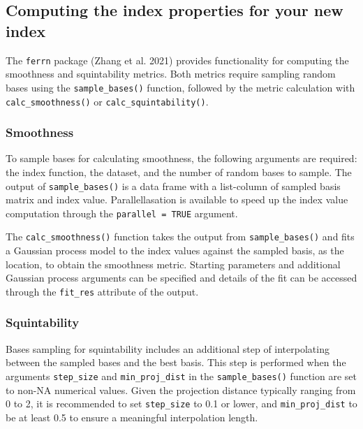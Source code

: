 \documentclass[
  12pt,
]{interact}
\theoremstyle{plain}
\begin{document}
\subsection{Computing the index properties for your new
index}\label{computing-the-index-properties-for-your-new-index}

The \texttt{ferrn} package (Zhang et al. 2021) provides functionality
for computing the smoothness and squintability metrics. Both metrics
require sampling random bases using the \texttt{sample\_bases()}
function, followed by the metric calculation with
\texttt{calc\_smoothness()} or \texttt{calc\_squintability()}.

\subsubsection{Smoothness}\label{smoothness}

To sample bases for calculating smoothness, the following arguments are
required: the index function, the dataset, and the number of random
bases to sample. The output of \texttt{sample\_bases()} is a data frame
with a list-column of sampled basis matrix and index value.
Parallellasation is available to speed up the index value computation
through the \texttt{parallel\ =\ TRUE} argument.

The \texttt{calc\_smoothness()} function takes the output from
\texttt{sample\_bases()} and fits a Gaussian process model to the index
values against the sampled basis, as the location, to obtain the
smoothness metric. Starting parameters and additional Gaussian process
arguments can be specified and details of the fit can be accessed
through the \texttt{fit\_res} attribute of the output.

\subsubsection{Squintability}\label{squintability}

Bases sampling for squintability includes an additional step of
interpolating between the sampled bases and the best basis. This step is
performed when the arguments \texttt{step\_size} and
\texttt{min\_proj\_dist} in the \texttt{sample\_bases()} function are
set to non-NA numerical values. Given the projection distance typically
ranging from 0 to 2, it is recommended to set \texttt{step\_size} to 0.1
or lower, and \texttt{min\_proj\_dist} to be at least 0.5 to ensure a
meaningful interpolation length.
\end{document}
